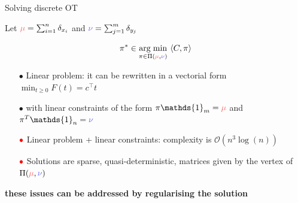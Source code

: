 \documentclass[pdf,aspectratio=169,10pt]{beamer}
\begin{document}
\begin{frame}{Solving discrete OT}



Let $\er{\mu}=\sum_{i=1}^n\delta_{x_i}$ and $\eb{\nu}=\sum_{j=1}^m\delta_{y_j}$
\begin{block}{}
$$\pi^\ast \in \underset{\pi\in\Pi(\er{\mu},\eb{\nu})}{\argmin} \ \langle C, \pi \rangle$$
\end{block}

\vspace{0.3cm}\begin{itemize}
\item[$\bullet$] Linear problem: it can be rewritten in a vectorial form $\min_{t\geq 0} F(t) = c^\top t$
\item[$\bullet$] with linear constraints of the form $\pi\mathds{1}_m =\er{\mu}$ and $\pi^T\mathds{1}_n=\eb{\nu}$
\end{itemize}
\vspace{0.5em}
\begin{itemize}
    \item[${\textcolor{red}{{\bf \bullet}}}$] Linear problem + linear constraints: complexity is $\mathcal{O}(n^3\log(n))$
    \item[${\textcolor{red}{{\bf \bullet}}}$] Solutions are sparse, quasi-deterministic, matrices given by the vertex of $\Pi(\er{\mu},\eb{\nu})$
\end{itemize}
\vspace{0.5em}
\centerline{\bf these issues can be addressed by regularising the solution}
\end{frame}
\end{document}
